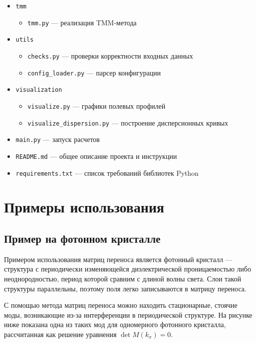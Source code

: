 \documentclass{article}
\begin{document}
\begin{itemize}
\begin{itemize}
      \item \texttt{tmm}
        \begin{itemize}
          \item \texttt{tmm.py} — реализация TMM-метода
        \end{itemize}
      \item \texttt{utils}
        \begin{itemize}
          \item \texttt{checks.py} — проверки корректности входных данных
          \item \texttt{config\_loader.py} — парсер конфигурации
        \end{itemize}
      \item \texttt{visualization}
        \begin{itemize}
          \item \texttt{visualize.py} — графики полевых профилей
          \item \texttt{visualize\_dispersion.py} — построение дисперсионных кривых
        \end{itemize}
      \item \texttt{main.py} — запуск расчетов
      \item \texttt{README.md} — общее описание проекта и инструкции
      \item \texttt{requirements.txt} — список требований библиотек Python
    \end{itemize}
\end{itemize}

\clearpage


\section{Примеры использования}
\subsection{Пример на фотонном кристалле}
Примером использования матриц переноса является фотонный кристалл — структура с периодически изменяющейся диэлектрической проницаемостью либо неоднородностью, период которой сравним с длиной волны света. Слои такой структуры параллельны, поэтому поля легко записываются в матрицу переноса.

С помощью метода матриц переноса можно находить стационарные, стоячие моды, возникающие из-за интерференции в периодической структуре. На рисунке ниже показана одна из таких мод для одномерного фотонного кристалла, рассчитанная как решение уравнения $\det M(k_x) = 0$.
\end{document}
